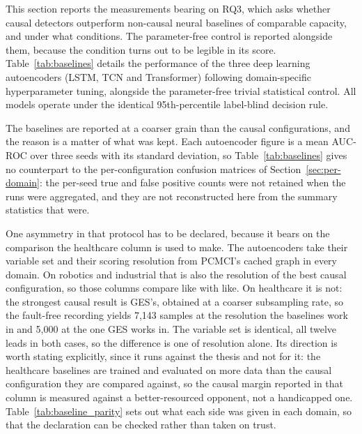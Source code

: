 This section reports the measurements bearing on RQ3, which asks whether causal detectors outperform non-causal neural baselines of comparable capacity, and under what conditions. The parameter-free control is reported alongside them, because the condition turns out to be legible in its score. Table~\ref{tab:baselines} details the performance of the three deep learning autoencoders (LSTM, TCN and Transformer) following domain-specific hyperparameter tuning, alongside the parameter-free trivial statistical control. All models operate under the identical 95th-percentile label-blind decision rule.

The baselines are reported at a coarser grain than the causal configurations, and the reason is a matter of what was kept. Each autoencoder figure is a mean AUC-ROC over three seeds with its standard deviation, so Table~\ref{tab:baselines} gives no counterpart to the per-configuration confusion matrices of Section~\ref{sec:per-domain}: the per-seed true and false positive counts were not retained when the runs were aggregated, and they are not reconstructed here from the summary statistics that were.

One asymmetry in that protocol has to be declared, because it bears on the comparison the healthcare column is used to make. The autoencoders take their variable set and their scoring resolution from PCMCI's cached graph in every domain. On robotics and industrial that is also the resolution of the best causal configuration, so those columns compare like with like. On healthcare it is not: the strongest causal result is GES's, obtained at a coarser subsampling rate, so the fault-free recording yields 7{,}143 samples at the resolution the baselines work in and 5{,}000 at the one GES works in. The variable set is identical, all twelve leads in both cases, so the difference is one of resolution alone. Its direction is worth stating explicitly, since it runs against the thesis and not for it: the healthcare baselines are trained and evaluated on more data than the causal configuration they are compared against, so the causal margin reported in that column is measured against a better-resourced opponent, not a handicapped one. Table~\ref{tab:baseline_parity} sets out what each side was given in each domain, so that the declaration can be checked rather than taken on trust.





